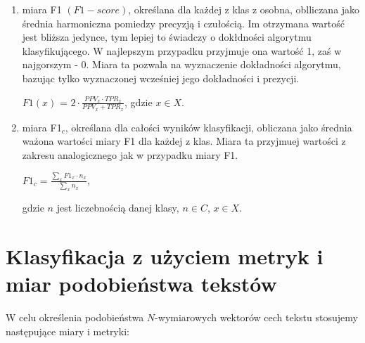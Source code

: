 \documentclass{classrep}
\begin{document}
\begin{enumerate}
\item miara F1 \((F1-score)\), określana dla każdej z klas z osobna, oblliczana jako średnia harmoniczna pomiedzy precyzją i czułością.
Im otrzymana wartość jest bliższa jedynce, tym lepiej to świadczy o dokłdności algorytmu klasyfikującego. W najlepszym przypadku przyjmuje ona wartość 1, zaś w najgorszym - 0.
Miara ta pozwala na wyznaczenie dokładności algorytmu, bazując tylko wyznaczonej wcześniej jego dokładności i prezycji.\\
\begin{center}
    $F1(x)$ = $2 \cdot \frac{PPV_{x} \cdot TPR_{x}} {PPV_{x} + TPR_{x}}$, gdzie $x\in X$.\\
  \end{center} \hfill \break

\item miara F1$_c$, określana dla całości wyników klasyfikacji, obliczana jako średnia ważona wartości miary F1 dla każdej z klas. Miara ta przyjmuej wartości z zakresu analogicznego jak w przypadku miary F1. \\
\begin{center}
    $F1_c = \frac{\sum_{x} F1_x \cdot n_{x}}{\sum_{x} n_{x}}$, \\
  \end{center}
  gdzie $n$ jest liczebnością danej klasy, $n\in C$, $x\in X$.
\end{enumerate}



\section{Klasyfikacja z użyciem metryk i miar podobieństwa tekstów}
W celu określenia podobieństwa $N$-wymiarowych wektorów cech tekstu stosujemy następujące miary i metryki: \\
\end{document}
